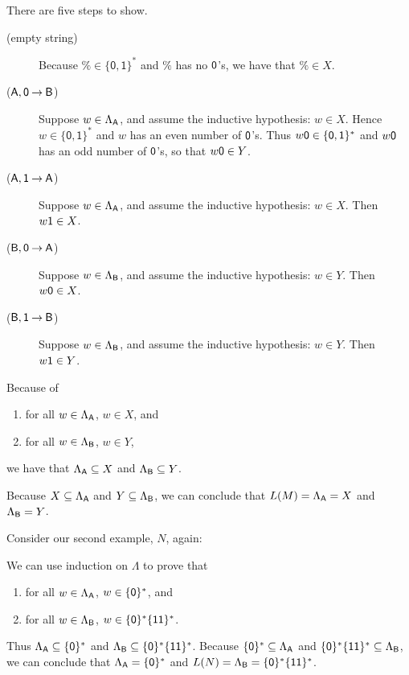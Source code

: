 There are five steps to show.
\begin{description}
\item[\quad(empty string)] Because $\%\in\{\mathsf{0,1}\}^*$ and $\%$
has no $\mathsf{0}$'s, we have that $\%\in X$.

\item[\quad($\mathsf{A}, \mathsf{0}\mathbin{\to}\mathsf{B}$)] Suppose $w\in\Lambda_{\mathsf{A}}$, and
  assume the inductive hypothesis: $w\in X$.  Hence
  $w\in\{\mathsf{0,1}\}^*$ and $w$ has an even number of $\mathsf{0}$'s.
  Thus $w\mathsf{0}\in\{\mathsf{0,1}\}^*$ and $w\mathsf{0}$ has an odd
  number of $\mathsf{0}$'s, so that $w\mathsf{0}\in Y$.
\end{description}

\begin{description}
\item[\quad($\mathsf{A}, \mathsf{1}\mathbin{\to}\mathsf{A}$)] Suppose $w\in\Lambda_{\mathsf{A}}$, and
  assume the inductive hypothesis: $w\in X$.  Then $w\mathsf{1}\in X$.

\item[\quad($\mathsf{B}, \mathsf{0}\mathbin{\to}\mathsf{A}$)] Suppose $w\in\Lambda_{\mathsf{B}}$, and
  assume the inductive hypothesis: $w\in Y$.  Then $w\mathsf{0}\in X$.

\item[\quad($\mathsf{B}, \mathsf{1}\mathbin{\to}\mathsf{B}$)] Suppose $w\in\Lambda_{\mathsf{B}}$, and
  assume the inductive hypothesis: $w\in Y$.  Then $w\mathsf{1}\in Y$.
\end{description}

Because of
\begin{enumerate}[\quad(A)]
\item for all $w\in\Lambda_{\mathsf{A}}$, $w\in X$, and

\item for all $w\in\Lambda_{\mathsf{B}}$, $w\in Y$,
\end{enumerate}
we have that
$\Lambda_{\mathsf{A}} \subseteq X$ and $\Lambda_{\mathsf{B}} \subseteq Y$.

Because $X \subseteq \Lambda_{\mathsf{A}}$ and $Y \subseteq \Lambda_{\mathsf{B}}$, we can
conclude that $L(M) = \Lambda_{\mathsf{A}} = X$ and $\Lambda_{\mathsf{B}} = Y$.

Consider our second example, $N$, again:
\begin{center}

\end{center}

We can use induction on $\Lambda$ to prove that
\begin{enumerate}[\quad(A)]
\item for all $w\in\Lambda_{\mathsf{A}}$, $w\in\{\mathsf{0}\}^*$, and

\item for all $w\in\Lambda_{\mathsf{B}}$, $w\in\{\mathsf{0}\}^*\{\mathsf{11}\}^*$.
\end{enumerate}
Thus $\Lambda_{\mathsf{A}}\subseteq\{\mathsf{0}\}^*$ and
$\Lambda_{\mathsf{B}}\subseteq\{\mathsf{0}\}^*\{\mathsf{11}\}^*$.  Because
$\{\mathsf{0}\}^*\subseteq\Lambda_{\mathsf{A}}$ and
$\{\mathsf{0}\}^*\{\mathsf{11}\}^*\subseteq\Lambda_{\mathsf{B}}$, we can conclude that
$\Lambda_{\mathsf{A}}=\{\mathsf{0}\}^*$ and
$L(N)=\Lambda_{\mathsf{B}}=\{\mathsf{0}\}^*\{\mathsf{11}\}^*$.


